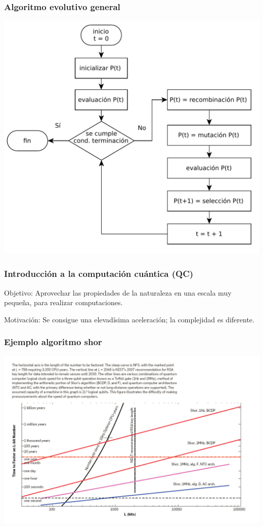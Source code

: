 \documentclass{beamer}
\begin{document}
\begin{frame}
\frametitle{Algoritmo evolutivo general}

\centering
\includegraphics[scale=0.4]{EA_flowchart.pdf}

\end{frame}
\begin{frame}
\frametitle{Introducción a la computación cuántica (QC)}
Objetivo: Aprovechar las propiedades de la naturaleza en una escala muy pequeña, 
para realizar computaciones.

Motivación: Se consigue una elevadísima aceleración; la complejidad es
diferente.

\end{frame}
\begin{frame}
\frametitle{Ejemplo algoritmo shor}
	\includegraphics[width=\textwidth]{shor}
\end{frame}
\end{document}
